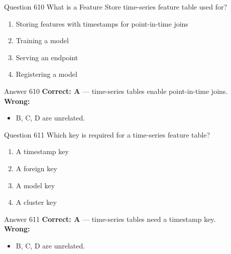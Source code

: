 \documentclass[aspectratio=169,11pt]{beamer}
\begin{document}
	\begin{frame}{Question 610}
		What is a Feature Store time-series feature table used for?
		\begin{enumerate}[label=\Alph*.]
			\item Storing features with timestamps for point-in-time joins
			\item Training a model
			\item Serving an endpoint
			\item Registering a model
		\end{enumerate}
	\end{frame}
	\begin{frame}{Answer 610}
		\textbf{Correct: A} --- time-series tables enable point-in-time joins.\\
		\vspace{0.5em}
		\textbf{Wrong:}
		\begin{itemize}
			\item B, C, D are unrelated.
		\end{itemize}
	\end{frame}
	
	\begin{frame}{Question 611}
		Which key is required for a time-series feature table?
		\begin{enumerate}[label=\Alph*.]
			\item A timestamp key
			\item A foreign key
			\item A model key
			\item A cluster key
		\end{enumerate}
	\end{frame}
	\begin{frame}{Answer 611}
		\textbf{Correct: A} --- time-series tables need a timestamp key.\\
		\vspace{0.5em}
		\textbf{Wrong:}
		\begin{itemize}
			\item B, C, D are unrelated.
		\end{itemize}
	\end{frame}
	
\end{document}
